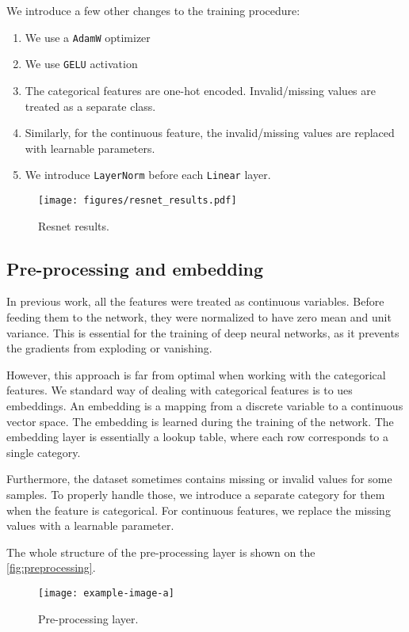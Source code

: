 We introduce a few other changes to the training procedure:

\begin{enumerate}
    \item We use a \verb|AdamW| optimizer \cite{adamw}
    \item We use \verb|GELU| activation \cite{gelu}
    \item The categorical features are one-hot encoded. Invalid/missing values are treated as a separate class.
    \item Similarly, for the continuous feature, the invalid/missing values are replaced with learnable parameters.
    \item We introduce \verb|LayerNorm| \cite{layernorm} before each \verb|Linear| layer.
\end{enumerate}

\begin{figure}[htbp]
    \centering
    \texttt{[image: figures/resnet\_results.pdf]}
    \caption{Resnet results.}
    \label{fig:resnet_results}
\end{figure}


\subsection{Pre-processing and embedding}

In previous work, all the features were treated as continuous variables. Before feeding them to the network, they were
normalized to have zero mean and unit variance. This is essential for the training of deep neural networks, as it
prevents the gradients from exploding or vanishing.

However, this approach is far from optimal when working with the categorical features. We standard way of dealing with
categorical features is to ues embeddings. An embedding is a mapping from a discrete variable to a continuous vector
space. The embedding is learned during the training of the network. The embedding layer is essentially a lookup table,
where each row corresponds to a single category.

Furthermore, the dataset sometimes contains missing or invalid values for some samples. To properly handle those, we
introduce a separate category for them when the feature is categorical. For continuous features, we replace the missing
values with a learnable parameter.

The whole structure of the pre-processing layer is shown on the \autoref{fig:preprocessing}.

\begin{figure}[htbp]
    \centering
    \texttt{[image: example-image-a]}
    \caption{Pre-processing layer.}
    \label{fig:preprocessing}
\end{figure}
